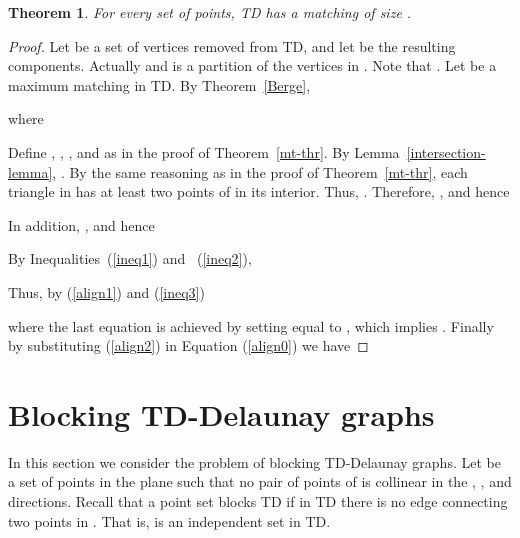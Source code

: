 \documentclass[11pt,a4paper]{article}
\newcommand{\kTD}[2]{\text{-}TD#2}
\newtheorem{theorem}{Theorem}
\begin{document}
\begin{theorem}
\label{matching-1TD}
 For every set  of points, \kTD{1}{} has a matching of size .
\end{theorem}

\begin{proof}
Let  be a set of  vertices removed from \kTD{1}{}, and let  be the resulting  components. Actually  and  is a partition of the vertices in . Note that .
Let  be a maximum matching in \kTD{1}{}. By Theorem~\ref{Berge}, 



where


Define , , , and  as in the proof of Theorem~\ref{mt-thr}. By Lemma~\ref{intersection-lemma}, .
By the same reasoning as in the proof of Theorem~\ref{mt-thr}, each triangle in  has at least two points of  in its interior. Thus, . Therefore, , and hence

 

In addition, , and hence



By Inequalities~(\ref{ineq1}) and ~(\ref{ineq2}), 



Thus, by (\ref{align1}) and (\ref{ineq3})



where the last equation is achieved by setting  equal to , which implies . Finally by substituting (\ref{align2}) in Equation (\ref{align0}) we have

\end{proof}
\section{Blocking TD-Delaunay graphs}
\label{blocking-section}
In this section we consider the problem of blocking TD-Delaunay graphs. Let  be a set of  points in the plane such that no pair of points of  is collinear in the , , and  directions. Recall that a point set  blocks \kTD{k}{} if in \kTD{k}{} there is no edge connecting two points in . That is,  is an independent set in \kTD{k}{}.
\end{document}
